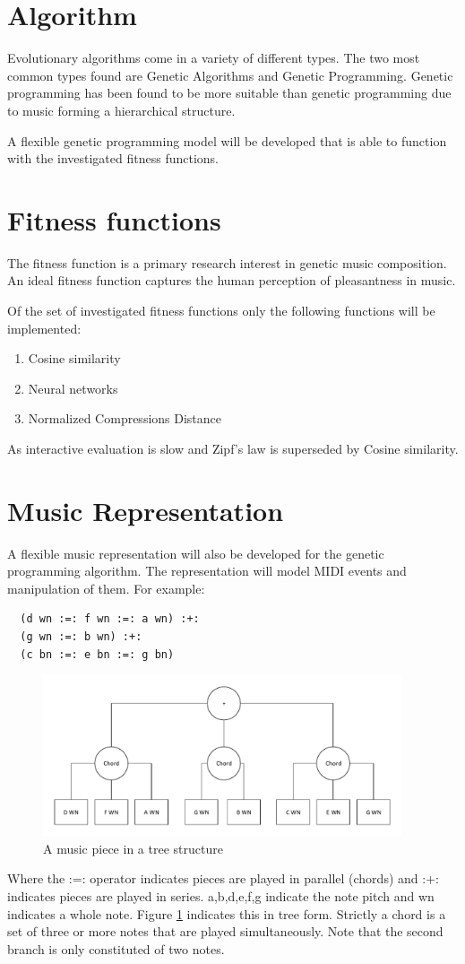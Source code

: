 \section{Algorithm}
Evolutionary algorithms come in a variety of different types. The two most common types found are Genetic Algorithms and Genetic Programming. Genetic programming has been found to be more suitable than genetic programming due to music forming a hierarchical structure.

A flexible genetic programming model will be developed that is able to function with the investigated fitness functions. 

\section{Fitness functions}
The fitness function is a primary research interest in genetic music composition. An ideal fitness function captures the human perception of pleasantness in music.


Of the set of investigated fitness functions only the following functions will be implemented:
\begin{enumerate}
\item Cosine similarity
\item Neural networks
\item Normalized Compressions Distance
\end{enumerate}
As interactive evaluation is slow and Zipf's law is superseded by Cosine similarity.

\section{Music Representation}
A flexible music representation will also be developed for the genetic programming algorithm. The representation will model \ac{MIDI} events and manipulation of them.
For example:
\begin{lstlisting}
  (d wn :=: f wn :=: a wn) :+:
  (g wn :=: b wn) :+:
  (c bn :=: e bn :=: g bn)
\end{lstlisting}
\begin{figure}
\center
\includegraphics[width=400px]{../images/tree_stuct_piece.pdf}
\caption{A music piece in a tree structure}
\label{ims:musicpieceextrree}
\end{figure}
Where the :=: operator indicates pieces are played in parallel (chords) and :+: indicates pieces are played in series. a,b,d,e,f,g indicate the note pitch and wn indicates a whole note.
Figure \ref{ims:musicpieceextrree} indicates this in tree form. Strictly a chord is a set of three or more notes that are played simultaneously. Note that the second branch is only constituted of two notes.

